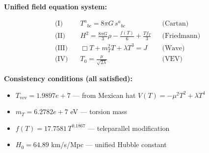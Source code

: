 
\textbf{Unified field equation system:}

\begin{align}
  \text{(I)} \quad & T^a{}_{bc} = 8\pi G \, s^a{}_{bc} && \text{(Cartan)} \\
  \text{(II)} \quad & H^2 = \frac{8\pi G}{3}\rho - \frac{f(T)}{6} + \frac{Tf_T}{3} && \text{(Friedmann)} \\
  \text{(III)} \quad & \Box T + m_T^2 T + \lambda T^3 = J && \text{(Wave)} \\
  \text{(IV)} \quad & T_0 = \frac{\mu}{\sqrt{2\lambda}} && \text{(VEV)}
\end{align}

\textbf{Consistency conditions (all satisfied):}
\begin{itemize}
  \item $T_{\text{vev}} = 1.9897e+7$ — from Mexican hat $V(T) = -\mu^2 T^2 + \lambda T^4$
  \item $m_T = 6.2782e+7$ eV — torsion mass
  \item $f(T) = 17.7581 \, T^{0.1867}$ — teleparallel modification
  \item $H_0 = 64.89$ km/s/Mpc — unified Hubble constant
\end{itemize}